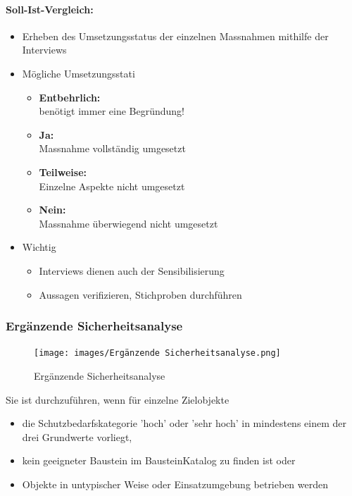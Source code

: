 \documentclass[10pt,a4paper]{article}
\begin{document}
\paragraph*{Soll-Ist-Vergleich:}
\begin{itemize}[noitemsep,topsep=0pt,leftmargin=*]
    \item Erheben des Umsetzungsstatus der einzelnen Massnahmen mithilfe der Interviews
    \item Mögliche Umsetzungsstati
    \begin{itemize}[noitemsep,topsep=0pt,leftmargin=*]
        \item \textbf{Entbehrlich:}\\benötigt immer eine Begründung!
        \item \textbf{Ja:}\\Massnahme vollständig umgesetzt
        \item \textbf{Teilweise:}\\Einzelne Aspekte nicht umgesetzt
        \item \textbf{Nein:}\\Massnahme überwiegend nicht umgesetzt
    \end{itemize}
    \item Wichtig
    \begin{itemize}[noitemsep,topsep=0pt,leftmargin=*]
        \item Interviews dienen auch der Sensibilisierung
        \item Aussagen verifizieren, Stichproben durchführen
    \end{itemize}
\end{itemize}

\subsubsection*{Ergänzende Sicherheitsanalyse}
\begin{figure}[H]
    \begin{center}
    \texttt{[image: images/Ergänzende Sicherheitsanalyse.png]}
    \caption{Ergänzende Sicherheitsanalyse}
    \label{Ergänzende Sicherheitsanalyse}
    \end{center}
\end{figure}

Sie ist durchzuführen, wenn für einzelne Zielobjekte
\begin{itemize}[noitemsep,topsep=0pt,leftmargin=*]
    \item die Schutzbedarfskategorie 'hoch' oder
    'sehr hoch' in mindestens einem der drei
    Grundwerte vorliegt,
    \item kein geeigneter Baustein im BausteinKatalog zu finden ist oder
    \item Objekte in untypischer Weise oder
    Einsatzumgebung betrieben werden
\end{itemize}
\end{document}
